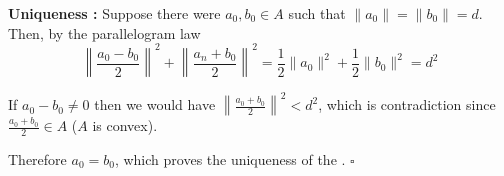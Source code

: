 \documentclass[12pt]{article}
\begin{document}
{\bf Uniqueness :} Suppose there were $a_0, b_0 \in A$ such that $\|a_0\| = \|b_0\| = d$. Then, by the parallelogram law
\begin{displaymath}
\left \|\frac{a_0-b_0}{2}\right \|^2+\left\|\frac{a_n+b_0}{2}\right\|^2 = \frac{1}{2}\|a_0\|^2 + \frac{1}{2}\|b_0\|^2=d^2
\end{displaymath}

If $a_0 - b_0 \neq 0$ then we would have $\displaystyle \left \|\frac{a_0 + b_0}{2} \right\|^2 < d^2$, which is contradiction since $\displaystyle \frac{a_0 + b_0}{2} \in A$ ($A$ is convex).

Therefore $a_0 = b_0$, which proves the uniqueness of the . $\square$
\end{document}
